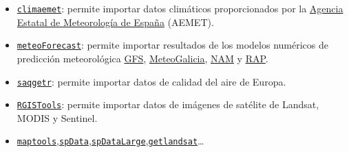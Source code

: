 \documentclass[
]{book}
\newenvironment{Shaded}{\begin{snugshade}}{\end{snugshade}}
\newcommand{\AttributeTok}[1]{\textcolor[rgb]{0.13,0.29,0.53}{#1}}
\newcommand{\CommentTok}[1]{\textcolor[rgb]{0.56,0.35,0.01}{\textit{#1}}}
\newcommand{\FloatTok}[1]{\textcolor[rgb]{0.00,0.00,0.81}{#1}}
\newcommand{\FunctionTok}[1]{\textcolor[rgb]{0.13,0.29,0.53}{\textbf{#1}}}
\newcommand{\NormalTok}[1]{#1}
\newcommand{\OtherTok}[1]{\textcolor[rgb]{0.56,0.35,0.01}{#1}}
\newcommand{\SpecialCharTok}[1]{\textcolor[rgb]{0.81,0.36,0.00}{\textbf{#1}}}
\newcommand{\StringTok}[1]{\textcolor[rgb]{0.31,0.60,0.02}{#1}}
\theoremstyle{break}
\theoremstyle{definition}
\theoremstyle{definition}
\theoremstyle{definition}
\theoremstyle{definition}
\theoremstyle{remark}
\begin{document}
\begin{itemize}
\item
  \href{https://ropenspain.github.io/climaemet}{\texttt{climaemet}}: permite importar datos climáticos proporcionados por la \href{https://opendata.aemet.es}{Agencia Estatal de Meteorología de España} (AEMET).
\item
  \href{https://github.com/oscarperpinan/meteoForecast}{\texttt{meteoForecast}}: permite importar resultados de los modelos numéricos de predicción meteorológica \href{https://www.ncdc.noaa.gov/data-access/model-data/model-datasets/global-forcast-system-gfs}{GFS},
  \href{https://www.meteogalicia.gal/web/modelos/threddsIndex.action}{MeteoGalicia}, \href{https://www.ncdc.noaa.gov/data-access/model-data/model-datasets/north-american-mesoscale-forecast-system-nam}{NAM} y \href{https://www.ncdc.noaa.gov/data-access/model-data/model-datasets/rapid-refresh-rap}{RAP}.
\item
  \href{https://github.com/skgrange/saqgetr}{\texttt{saqgetr}}: permite importar datos de calidad del aire de Europa.
\item
  \href{https://github.com/spatialstatisticsupna/RGISTools}{\texttt{RGISTools}}: permite importar datos de imágenes de satélite de Landsat, MODIS y Sentinel.
\item
  \href{https://CRAN.R-project.org/package=maptools}{\texttt{maptools}},\href{https://CRAN.R-project.org/package=spData}{\texttt{spData}},\href{https://CRAN.R-project.org/package=spDataLarge}{\texttt{spDataLarge}},\href{https://CRAN.R-project.org/package=getlandsat}{\texttt{getlandsat}}\ldots{}
\end{itemize}

\begin{Shaded}
\end{Shaded}
\end{document}
